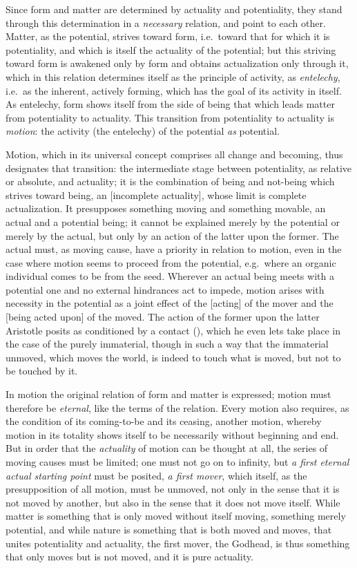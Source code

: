 Since form and matter are determined by actuality and potentiality, they stand through this determination in a \emph{necessary}
relation, and point to each other. Matter, as the potential,
strives toward form, i.e.\ toward that for which it is potentiality, and which is itself the actuality of the potential; but this
striving toward form is awakened only by form and obtains
actualization only through it, which in this relation determines
itself as the principle of activity, as \emph{entelechy}, i.e.\ as the
inherent, actively forming, which has the goal of its activity in
itself. As entelechy, form shows itself from the side of being
that which leads matter from potentiality to actuality. This
transition from potentiality to actuality is \emph{motion}: the activity (the entelechy) of the potential \emph{as} potential.

Motion, which in its universal concept comprises all change and becoming, thus designates that transition: the intermediate stage between potentiality, as relative or absolute, and actuality; it is the combination of being and not-being which
strives toward being, an  [incomplete actuality], whose limit
is complete actualization. It presupposes something moving and something movable, an actual and a potential being;
it cannot be explained merely by the potential or merely by the
actual, but only by an action of the latter upon the former.
The actual must, as moving cause, have a priority
in relation to motion, even in the case where motion
seems to proceed from the potential, e.g.\ where an organic individual
comes to be from the seed. Wherever an actual being meets
with a potential one and no external hindrances act to
impede, motion arises with necessity in the potential as a joint effect of the  [acting] of the mover and
the  [being acted upon] of the moved. The action of the former upon the latter
Aristotle posits as conditioned by a contact (), which he even lets take place in the case of the purely immaterial, though
in such a way that the immaterial unmoved, which moves the world,
is indeed to touch what is moved, but not to be touched by it.

In motion the original relation of form and matter is
expressed; motion must therefore be \emph{eternal}, like the terms of the relation. Every motion also requires, as the condition of
its coming-to-be and its ceasing, another motion, whereby motion in its totality shows itself to be necessarily without beginning and end. But in order that the \emph{actuality} of motion can be thought at all, the series of moving causes must
be limited; one must not go on to infinity, but
\emph{a first eternal actual starting point} must be posited,
\emph{a first mover}, which itself, as the presupposition of all motion, must be unmoved, not only in the sense that
it is not moved by another, but also in the sense that it does not move itself. While matter is something that is only moved without itself moving, something merely potential, and while
nature is something that is both moved and moves, that
unites potentiality and actuality, the first mover, the Godhead, is thus something that only moves but is not moved, and it is pure actuality.

